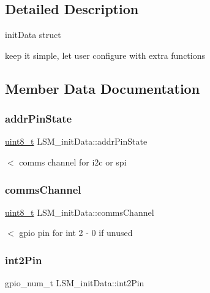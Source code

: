 \subsection{Detailed Description}
init\+Data struct
\begin{DoxyItemize}
\item keep it simple, let user configure with extra functions 
\end{DoxyItemize}

\subsection{Member Data Documentation}
\mbox{\label{structLSM__initData_a53b58c95bfcef402318923290252796a}} 
\subsubsection{\texorpdfstring{addr\+Pin\+State}{addrPinState}}
{\footnotesize\ttfamily \hyperlink{vl53l0x__types_8h_aba7bc1797add20fe3efdf37ced1182c5}{uint8\+\_\+t} L\+S\+M\+\_\+init\+Data\+::addr\+Pin\+State}

$<$ comms channel for i2c or spi \mbox{\label{structLSM__initData_a9742f792882a0ed6f85898600cf923b2}} 
\subsubsection{\texorpdfstring{comms\+Channel}{commsChannel}}
{\footnotesize\ttfamily \hyperlink{vl53l0x__types_8h_aba7bc1797add20fe3efdf37ced1182c5}{uint8\+\_\+t} L\+S\+M\+\_\+init\+Data\+::comms\+Channel}

$<$ gpio pin for int 2 -\/ 0 if unused \mbox{\label{structLSM__initData_a835c4e1a7a48cd95ef86123477e172d3}} 
\subsubsection{\texorpdfstring{int2\+Pin}{int2Pin}}
{\footnotesize\ttfamily gpio\+\_\+num\+\_\+t L\+S\+M\+\_\+init\+Data\+::int2\+Pin}


